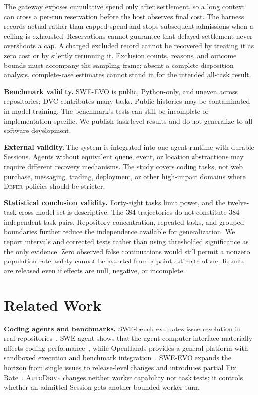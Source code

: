 \documentclass[sigconf,nonacm]{acmart}
\newcommand{\system}{\textsc{AutoDrive}}
\newcommand{\deferaction}{\textsc{Defer}}
\begin{document}
The gateway exposes cumulative spend only after settlement, so a long context can cross a per-run reservation before the host observes final cost. The harness records actual rather than capped spend and stops subsequent admissions when a ceiling is exhausted. Reservations cannot guarantee that delayed settlement never overshoots a cap. A charged excluded record cannot be recovered by treating it as zero cost or by silently rerunning it. Exclusion counts, reasons, and outcome bounds must accompany the sampling frame; absent a complete disposition analysis, complete-case estimates cannot stand in for the intended all-task result.

\textbf{Benchmark validity.} SWE-EVO is public, Python-only, and uneven across repositories; DVC contributes many tasks. Public histories may be contaminated in model training. The benchmark's tests can still be incomplete or implementation-specific. We publish task-level results and do not generalize to all software development.

\textbf{External validity.} The system is integrated into one agent runtime with durable Sessions. Agents without equivalent queue, event, or location abstractions may require different recovery mechanisms. The study covers coding tasks, not web purchase, messaging, trading, deployment, or other high-impact domains where \deferaction{} policies should be stricter.

\textbf{Statistical conclusion validity.} Forty-eight tasks limit power, and the twelve-task cross-model set is descriptive. The 384 trajectories do not constitute 384 independent task pairs. Repository concentration, repeated tasks, and grouped boundaries further reduce the independence available for generalization. We report intervals and corrected tests rather than using thresholded significance as the only evidence. Zero observed false continuations would still permit a nonzero population rate; safety cannot be asserted from a point estimate alone. Results are released even if effects are null, negative, or incomplete.

\section{Related Work}

\textbf{Coding agents and benchmarks.} SWE-bench evaluates issue resolution in real repositories~\cite{jimenez2024swebench}. SWE-agent shows that the agent-computer interface materially affects coding performance~\cite{yang2024sweagent}, while OpenHands provides a general platform with sandboxed execution and benchmark integration~\cite{wang2024openhands}. SWE-EVO expands the horizon from single issues to release-level changes and introduces partial Fix Rate~\cite{le2025sweevo}. \system{} changes neither worker capability nor task tests; it controls whether an admitted Session gets another bounded worker turn.
\end{document}
